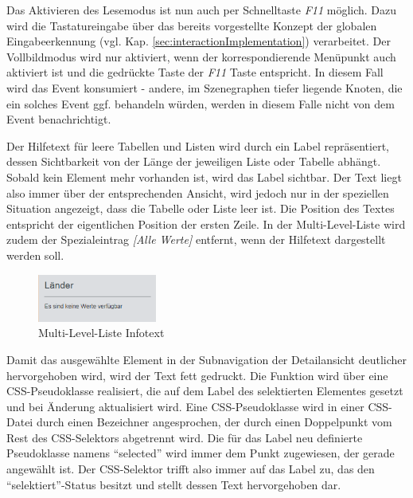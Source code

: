 Das Aktivieren des Lesemodus ist nun auch per Schnelltaste \textit{F11} möglich. Dazu wird die Tastatureingabe über das bereits vorgestellte Konzept der globalen Eingabeerkennung (vgl. Kap. \ref{sec:interactionImplementation}) verarbeitet. Der Vollbildmodus wird nur aktiviert, wenn der korrespondierende Menüpunkt auch aktiviert ist und die gedrückte Taste der \textit{F11} Taste entspricht. In diesem Fall wird das Event konsumiert - andere, im Szenegraphen tiefer liegende Knoten, die ein solches Event ggf. behandeln würden, werden in diesem Falle nicht von dem Event benachrichtigt.\par
{}
Der Hilfetext für leere Tabellen und Listen wird durch ein Label repräsentiert, dessen Sichtbarkeit von der Länge der jeweiligen Liste oder Tabelle abhängt. Sobald kein Element mehr vorhanden ist, wird das Label sichtbar. Der Text liegt also immer über der entsprechenden Ansicht, wird jedoch nur in der speziellen Situation angezeigt, dass die Tabelle oder Liste leer ist. Die Position des Textes entspricht der eigentlichen Position der ersten Zeile. In der Multi-Level-Liste wird zudem der Spezialeintrag \textit{[Alle Werte]} entfernt, wenn der Hilfetext dargestellt werden soll.\par
\begin{figure}[H]
 \centering
 \includegraphics[width=0.35\textwidth]{grafiken/mll_no_values.png}
 \caption{Multi-Level-Liste Infotext}
 \label{fig:mllNoValues}
\end{figure}
Damit das ausgewählte Element in der Subnavigation der Detailansicht deutlicher hervorgehoben wird, wird der Text fett gedruckt. Die Funktion wird über eine CSS-Pseudoklasse realisiert, die auf dem Label des selektierten Elementes gesetzt und bei Änderung aktualisiert wird. Eine CSS-Pseudoklasse wird in einer CSS-Datei durch einen Bezeichner angesprochen, der durch einen Doppelpunkt vom Rest des CSS-Selektors abgetrennt wird. Die für das Label neu definierte Pseudoklasse namens \enquote{selected} wird immer dem Punkt zugewiesen, der gerade angewählt ist. Der CSS-Selektor trifft also immer auf das Label zu, das den \enquote{selektiert}-Status besitzt und stellt dessen Text hervorgehoben dar.\par
